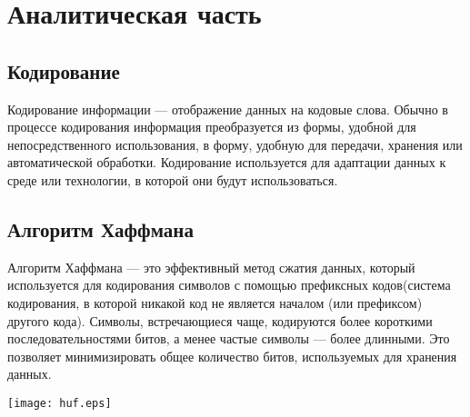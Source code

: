 \chapter{Аналитическая часть}
\section{Кодирование}
Кодирование информации --- отображение данных на кодовые слова. Обычно в процессе кодирования информация преобразуется из формы, удобной для непосредственного использования, в форму, удобную для передачи, хранения или автоматической обработки. Кодирование используется для адаптации данных к среде или технологии, в которой они будут использоваться.

\section{Алгоритм Хаффмана}
Алгоритм Хаффмана — это эффективный метод сжатия данных, который используется для кодирования символов с помощью префиксных кодов(система кодирования, в которой никакой код не является началом (или префиксом) другого кода). Символы, встречающиеся чаще, кодируются более короткими последовательностями битов, а менее частые символы — более длинными. Это позволяет минимизировать общее количество битов, используемых для хранения данных.

{\centering
\texttt{[image: huf.eps]}
}
\clearpage
